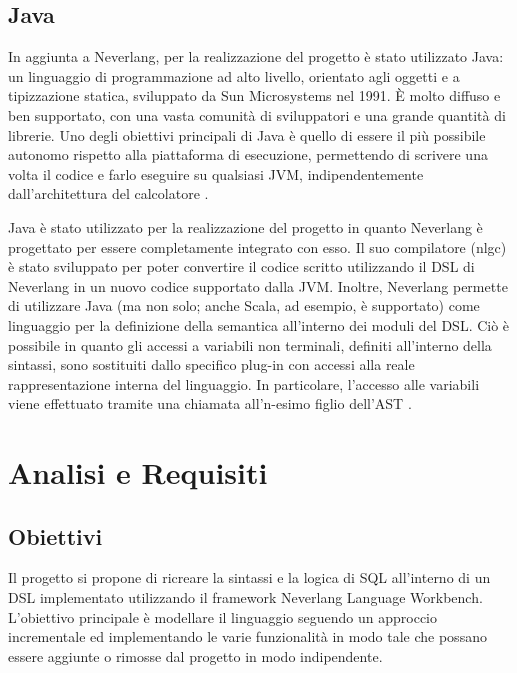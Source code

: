 \documentclass[12pt,a4paper,openright,twoside]{book}
\begin{document}
\section{Java}
In aggiunta a Neverlang, per la realizzazione del progetto è stato utilizzato Java: un linguaggio di programmazione ad alto livello, 
orientato agli oggetti e a tipizzazione statica, sviluppato da Sun Microsystems nel 1991. È molto diffuso e ben supportato, con una vasta 
comunità di sviluppatori e una grande quantità di librerie. Uno degli obiettivi principali di Java è quello di essere il più possibile 
autonomo rispetto alla piattaforma di esecuzione, permettendo di scrivere una volta il codice e farlo eseguire su qualsiasi \ac{JVM}, 
indipendentemente dall'architettura del calcolatore \cite{IBMWebsite}.

Java è stato utilizzato per la realizzazione del progetto in quanto Neverlang è progettato per essere completamente integrato con esso. Il suo 
compilatore (nlgc) è stato sviluppato per poter convertire il codice scritto utilizzando il DSL di Neverlang in un nuovo codice supportato 
dalla \ac{JVM}. Inoltre, Neverlang permette di utilizzare Java (ma non solo; anche Scala, ad esempio, è supportato) come linguaggio per la 
definizione della semantica all'interno dei moduli del \ac{DSL}. Ciò è possibile in quanto gli accessi a variabili non terminali, definiti 
all'interno della sintassi, sono sostituiti dallo specifico plug-in con accessi alla reale rappresentazione interna del linguaggio. In 
particolare, l'accesso alle variabili viene effettuato tramite una chiamata all'n-esimo figlio dell'\ac{AST} \cite{Cazzola2013}.

\chapter{Analisi e Requisiti}
\label{chap:requisiti}

\section{Obiettivi}
Il progetto si propone di ricreare la sintassi e la logica di \ac{SQL} all’interno di un \ac{DSL} implementato utilizzando il framework 
Neverlang Language Workbench. L’obiettivo principale è modellare il linguaggio seguendo un approccio incrementale ed implementando le varie 
funzionalità in modo tale che possano essere aggiunte o rimosse dal progetto in modo indipendente.
\end{document}
